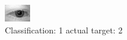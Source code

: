 \begin{figure}[h!]
\begin{center}
\includegraphics[width=0.60\columnwidth]{figures/ID472_class_1_target_2.png}
\end{center}
\caption{ Classification: 1 actual target: 2}
\label{fig:ID472_class_1_target_2}
\end{figure}
